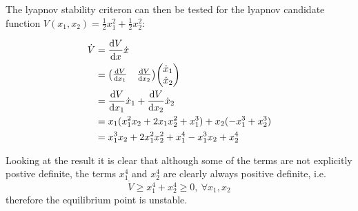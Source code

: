 \documentclass[]{article}
\begin{document}
The lyapnov stability criteron can then be tested for the lyapnov candidate function  $V(x_1, x_2) = \frac{1}{2} x_1^2 + \frac{1}{2} x_2^2$:

\begin{align*}
	\dot{V} &= \dv{V}{x} \dot{x}\\
	&= \mqty(\dv{V}{x_1} & \dv{V}{x_2}) \mqty(\dot{x}_1\\ \dot{x}_2)\\
	&= \dv{V}{x_1} \dot{x}_1 + \dv{V}{x_2} \dot{x}_2\\
	&= x_1 ( x_1^2 x_2 + 2 x_1 x_2^2 + x_1^3) + x_2 (-x_1^3 + x_2^3)\\
	&= x_1^3 x_2 + 2 x_1^2 x_2^2 + x_1^4 - x_1^3 x_2 + x_2^4
\end{align*}

Looking at the result it is clear that although some of the terms are not explicitly postive definite, the terms $x_1^4$ and $x_2^4$ are clearly always positive definite, i.e.
\begin{displaymath}
	\dot{V} \geq x_1^4 + x_2^4 \geq 0, \ \forall x_1, x_2
\end{displaymath}
therefore the equilibrium point is unstable.





	
\end{document}
